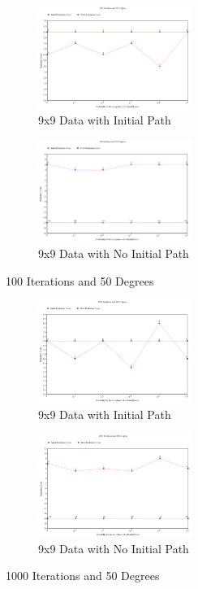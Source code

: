 \documentclass[11pt, oneside]{article}   	%
\begin{document}
\begin{figure}[H]
\centering
\begin{subfigure}{.5\textwidth}
	\centering
	\includegraphics[width=50mm]{9x9lowIlowT.png}
	\caption{9x9 Data with Initial Path}
	\label{fig:method}
\end{subfigure}%
\begin{subfigure}{.5\textwidth}
	\centering
	\includegraphics[width=50mm]{9x9lowIlowTPath.png}
	\caption{9x9 Data with No Initial Path}
	\label{fig:method}
\end{subfigure}
\caption{100 Iterations and 50 Degrees}
\end{figure}

\begin{figure}[H]
\centering
\begin{subfigure}{.5\textwidth}
	\centering
	\includegraphics[width=50mm]{9x9highIhighT.png}
	\caption{9x9 Data with Initial Path}
	\label{fig:method}
\end{subfigure}%
\begin{subfigure}{.5\textwidth}
	\centering
	\includegraphics[width=50mm]{9x9highIhighTPath.png}
	\caption{9x9 Data with No Initial Path}
	\label{fig:method}
\end{subfigure}
\caption{1000 Iterations and 50 Degrees}
\end{figure}
\end{document}

